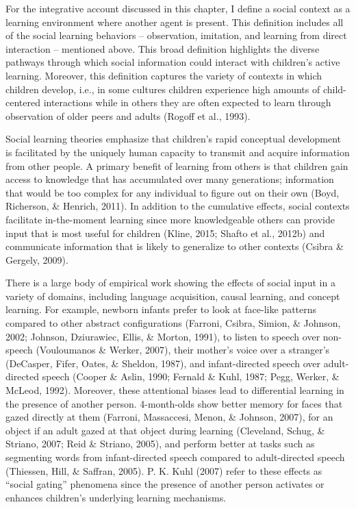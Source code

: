 \documentclass[oneside]{report}
\begin{document}
For the integrative account discussed in this chapter, I define a social
context as a learning environment where another agent is present. This
definition includes all of the social learning behaviors -- observation,
imitation, and learning from direct interaction -- mentioned above. This
broad definition highlights the diverse pathways through which social
information could interact with children's active learning. Moreover,
this definition captures the variety of contexts in which children
develop, i.e., in some cultures children experience high amounts of
child-centered interactions while in others they are often expected to
learn through observation of older peers and adults (Rogoff et al.,
1993).

Social learning theories emphasize that children's rapid conceptual
development is facilitated by the uniquely human capacity to transmit
and acquire information from other people. A primary benefit of learning
from others is that children gain access to knowledge that has
accumulated over many generations; information that would be too complex
for any individual to figure out on their own (Boyd, Richerson, \&
Henrich, 2011). In addition to the cumulative effects, social contexts
facilitate in-the-moment learning since more knowledgeable others can
provide input that is most useful for children (Kline, 2015; Shafto et
al., 2012b) and communicate information that is likely to generalize to
other contexts (Csibra \& Gergely, 2009).

There is a large body of empirical work showing the effects of social
input in a variety of domains, including language acquisition, causal
learning, and concept learning. For example, newborn infants prefer to
look at face-like patterns compared to other abstract configurations
(Farroni, Csibra, Simion, \& Johnson, 2002; Johnson, Dziurawiec, Ellis,
\& Morton, 1991), to listen to speech over non-speech (Vouloumanos \&
Werker, 2007), their mother's voice over a stranger's (DeCasper, Fifer,
Oates, \& Sheldon, 1987), and infant-directed speech over adult-directed
speech (Cooper \& Aslin, 1990; Fernald \& Kuhl, 1987; Pegg, Werker, \&
McLeod, 1992). Moreover, these attentional biases lead to differential
learning in the presence of another person. 4-month-olds show better
memory for faces that gazed directly at them (Farroni, Massaccesi,
Menon, \& Johnson, 2007), for an object if an adult gazed at that object
during learning (Cleveland, Schug, \& Striano, 2007; Reid \& Striano,
2005), and perform better at tasks such as segmenting words from
infant-directed speech compared to adult-directed speech (Thiessen,
Hill, \& Saffran, 2005). P. K. Kuhl (2007) refer to these effects as
``social gating'' phenomena since the presence of another person
activates or enhances children's underlying learning mechanisms.
\end{document}

